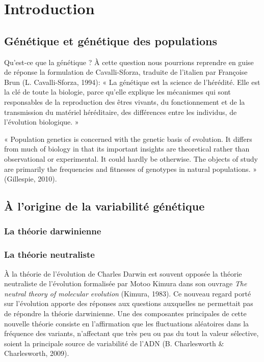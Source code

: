 \documentclass[12pt,twoside]{reedthesis}
\begin{document}
  
  \mainmatter %
  \pagestyle{fancyplain} %

  \chapter*{Introduction}\label{introduction}
  
  \section{Génétique et génétique des
  populations}\label{genetique-et-genetique-des-populations}
  
  Qu'est-ce que la génétique ? À cette question nous pourrions reprendre
  en guise de réponse la formulation de Cavalli-Sforza, traduite de
  l'italien par Françoise Brun (L. Cavalli-Sforza, 1994): « La génétique
  est la science de l'hérédité. Elle est la clé de toute la biologie,
  parce qu'elle explique les mécanismes qui sont responsables de la
  reproduction des êtres vivants, du fonctionnement et de la transmission
  du matériel héréditaire, des différences entre les individus, de
  l'évolution biologique. »
  
  « Population genetics is concerned with the genetic basis of evolution.
  It differs from much of biology in that its important insights are
  theoretical rather than observational or experimental. It could hardly
  be otherwise. The objects of study are primarily the frequencies and
  fitnesses of genotypes in natural populations. » (Gillespie, 2010).
  
  \section{À l'origine de la variabilité
  génétique}\label{a-lorigine-de-la-variabilite-genetique}
  
  \subsection{La théorie darwinienne}\label{la-theorie-darwinienne}
  
  \subsection{La théorie neutraliste}\label{la-theorie-neutraliste}
  
  À la théorie de l'évolution de Charles Darwin est souvent opposée la
  théorie neutraliste de l'évolution formalisée par Motoo Kimura dans son
  ouvrage \textit{The neutral theory of molecular evolution} (Kimura,
  1983). Ce nouveau regard porté sur l'évolution apporte des réponses aux
  questions auxquelles ne permettait pas de répondre la théorie
  darwinienne. Une des composantes principales de cette nouvelle théorie
  consiste en l'affirmation que les fluctuations aléatoires dans la
  fréquence des variants, n'affectant que très peu ou pas du tout la
  valeur sélective, soient la principale source de variabilité de l'ADN
  (B. Charlesworth \& Charlesworth, 2009).
  
\end{document}
